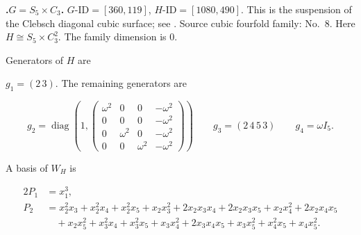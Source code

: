 \documentclass[12pt]{amsart}
\numberwithin{equation}{section}
\theoremstyle{plain}
\theoremstyle{definition}
\theoremstyle{remark}
\DeclareMathOperator{\diag}{diag}
\newenvironment{familydisplay}{%
  \begingroup
  \setlength{\arraycolsep}{1.35pt}%
  \renewcommand{\arraystretch}{0.96}%
  \setlength{\jot}{2pt}%
}{\endgroup}
\newcommand{\smat}[1]{\left(\begin{smallmatrix}#1\end{smallmatrix}\right)}
\begin{document}
\par{}\medskip\noindent\textbf{.\enspace $G=S_5\times C_3$.}\label{fam:threefold-no-3}
$G\text{-ID}=[360,119]$, $H\text{-ID}=[1080,490]$.
This is the suspension of the Clebsch diagonal cubic surface; see \cite[Example~3.1(6)]{LiYuThreefold}.
Source cubic fourfold family: No.~8.  Here
$H\cong S_5\times C_3^2$.
The family dimension is $0$.
\par\smallskip\noindent Generators of $H$ are\par\nopagebreak
\noindent \(g_1=(2\,3)\).  The remaining generators are
\begin{familydisplay}
\[
g_{2}=\diag\!\left(1,
\smat{\omega^2&0&0&-\omega^2\\0&0&0&-\omega^2\\0&\omega^2&0&-\omega^2\\0&0&\omega^2&-\omega^2}\right)
\qquad
g_{3}=(2\,4\,5\,3)
\qquad g_{4}=\omega I_5.
\]
\end{familydisplay}
\par\smallskip\noindent A basis of $W_H$ is\par\nopagebreak
\begin{familydisplay}
\begin{alignat*}{2}
P_{1}&=x_{1}^{3},\\[2pt]
P_{2}&=x_{2}^{2}x_{3}+x_{2}^{2}x_{4}+x_{2}^{2}x_{5}+x_{2}x_{3}^{2}+2x_{2}x_{3}x_{4}+2x_{2}x_{3}x_{5}+x_{2}x_{4}^{2}+2x_{2}x_{4}x_{5}\\
&\quad +x_{2}x_{5}^{2}+x_{3}^{2}x_{4}+x_{3}^{2}x_{5}+x_{3}x_{4}^{2}+2x_{3}x_{4}x_{5}+x_{3}x_{5}^{2}+x_{4}^{2}x_{5}+x_{4}x_{5}^{2}.\\[2pt]
\end{alignat*}
\end{familydisplay}
\end{document}
